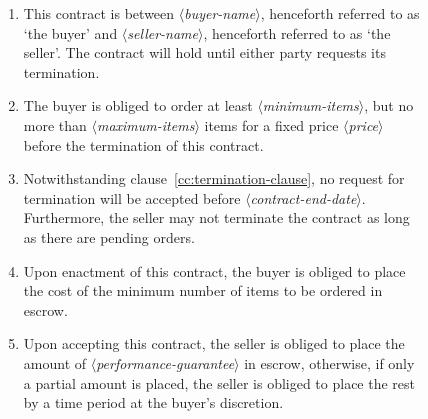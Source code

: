 \documentclass{article}
\newcommand{\placeholder}[1]{\mbox{$\langle$\textit{#1}$\rangle$}}
\begin{document}
   
   \begin{figure}[t]
   \setlength{\belowcaptionskip}{-20pt}
    \scriptsize %
    {\itshape
    \begin{enumerate}
     \item \label{cc:termination-clause} This contract is between \placeholder{buyer-name}, henceforth referred to as `the buyer' and \placeholder{seller-name}, henceforth referred to as `the seller'. The contract will hold until either party requests its termination.
     \item \label{cc:contract-parameters} The buyer is obliged to order at least \placeholder{minimum-items}, but no more than \placeholder{maximum-items} items for a fixed price \placeholder{price} before the termination of this contract. 
     \item \label{cc:escrow-payment-for-contract} Notwithstanding clause~\ref{cc:termination-clause}, no request for termination will be accepted before \placeholder{contract-end-date}. Furthermore, the seller may not terminate the contract as long as there are pending orders.
     \item Upon enactment of this contract, the buyer is obliged to place the cost of the minimum number of items to be ordered in escrow.
     \item \label{cc:performance-guarantee-escrow} Upon accepting this contract, the seller is obliged to place the amount of \placeholder{performance-guarantee} in escrow, otherwise, if only a partial amount is placed, the seller is obliged to place the rest by a time period at the buyer's discretion.%

\end{enumerate}}
\end{figure}
\end{document}
